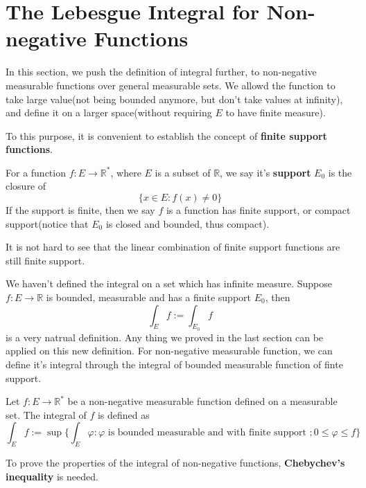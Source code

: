 \documentclass[lang=en, 12pt]{elegantbook}
\newcommand{\RR}{\mathbb{R}}
\begin{document}
        \section{The Lebesgue Integral for Non-negative Functions}
            In this section, we push the definition of integral further, to non-negative measurable functions over general measurable 
        sets. We allowd the function to take large value(not being bounded anymore, but don't take values at infinity), and define it on a larger space(without requiring
        $E$ to have finite measure).\par  
            To this purpose, it is convenient to establish the concept of \textbf{finite support functions}.
            \begin{definition}[Support]
                For a function $f:E \to \RR^*$, where $E$ is a subset of $\RR$, we say it's \textbf{support} $E_0$ is the closure of 
            $$\{x\in E: f(x) \neq 0\}$$
                If the support is finite, then we say $f$ is a function has finite support, or compact support(notice that $E_0$ is closed 
            and bounded, thus compact).
            \end{definition}\par
            It is not hard to see that the linear combination of finite support functions are still finite support.\par 
            We haven't defined the integral on a set which has infinite measure. Suppose $f:E\to \RR$ is bounded, measurable
        and has a finite support $E_0$, then $$\int_E f := \int_{E_0} f$$
        is a very natrual definition. Any thing we proved in the last section can be applied on this new definition. For non-negative 
        measurable function, we can define it's integral through the integral of bounded measurable function of finte support.
            \begin{definition}
                Let $f:E \to \RR^*$ be a non-negative measurable function defined on a measurable set. The integral of $f$ is defined as 
            \begin{equation}
                \int_E f := \sup\{\int_E \varphi : \varphi \mbox{ is bounded measurable and with finite support }; 0\leq \varphi \leq f\}
            \end{equation}
            \end{definition}
            To prove the properties of the integral of non-negative functions, \textbf{Chebychev's inequality} is needed.
\end{document}
